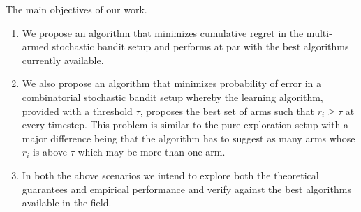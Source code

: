 The main objectives of our work.
\begin{enumerate}
\item We propose an algorithm that minimizes cumulative regret in the multi-armed stochastic bandit setup  and performs at par with the best algorithms currently available.
\item We also propose an algorithm that minimizes probability of error in a combinatorial stochastic bandit setup whereby the learning algorithm, provided with a threshold $\tau$, proposes the best set of arms such that $r_{i}\geq \tau$ at every timestep. This problem is similar to the pure exploration setup with a major difference being that the algorithm has to suggest as many arms whose $r_{i}$ is above $\tau$ which may be more than one arm.
\item In both the above scenarios we intend to explore both the theoretical guarantees and empirical performance and verify against the best algorithms available in the field.     
\end{enumerate}